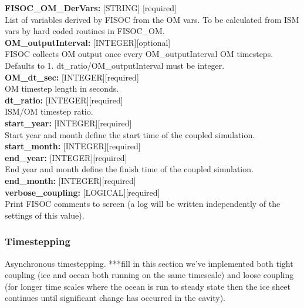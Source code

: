 \documentclass[12pt]{article}
\begin{document}
\begin{flushleft}
\vspace{6pt}
\textbf{FISOC\_OM\_DerVars:}  [STRING] [required]                         \\
List of variables derived by FISOC from the OM vars.  
To be calculated from ISM vars by hard coded routines in FISOC\_OM.       \\
\vspace{6pt}
\textbf{OM\_outputInterval:} [INTEGER][optional]                          \\
FISOC collects OM output once every OM\_outputInterval OM timesteps. 
Defaults to 1.  dt\_ratio/OM\_outputInterval must be integer.             \\
\vspace{6pt}
\textbf{OM\_dt\_sec:}         [INTEGER][required]                         \\
OM timestep length in seconds.                                            \\
\vspace{6pt}
\textbf{dt\_ratio:}          [INTEGER][required]                          \\
ISM/OM timestep ratio.                                                    \\
\vspace{6pt}
\textbf{start\_year:}        [INTEGER][required]                          \\
Start year and month define the start time of the coupled simulation.     \\
\vspace{6pt}
\textbf{start\_month:}       [INTEGER][required]                          \\
\vspace{6pt}
\textbf{end\_year:}          [INTEGER][required]                          \\
End year and month define the finish time of the coupled simulation.      \\
\vspace{6pt}
\textbf{end\_month:}         [INTEGER][required]                          \\
\vspace{6pt}
\textbf{verbose\_coupling:}  [LOGICAL][required]                          \\
Print FISOC comments to screen (a log will be written independently of the settings of this value).\\
\end{flushleft}

\subsubsection{Timestepping}
Asynchronous timestepping.
***fill in this section we've implemented both tight coupling (ice and ocean both running 
on the same timescale) and loose coupling (for longer time scales where the ocean is run 
to steady state then the ice sheet continues until significant change has occurred in the cavity).
\end{document}
